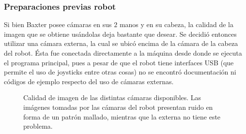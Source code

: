 \subsubsection{Preparaciones previas robot}
Si bien Baxter posee cámaras en sus $2$ manos y en su cabeza, la calidad de la imagen que se obtiene usándolas deja bastante que desear. Se decidió entonces utilizar una cámara externa, la cual se ubicó encima de la cámara de la cabeza del robot. Ésta fue conectada directamente a la máquina desde donde se ejecuta el programa principal, pues a pesar de que el robot tiene interfaces USB (que permite el uso de joysticks entre otras cosas) no se encontró documentación ni códigos de ejemplo respecto del uso de cámaras externas.
\begin{figure}[h!]
	\centering
	\hfill
	\hfill
	\hfill
	\caption[Calidad de imagen de las distintas cámaras disponibles.]{Calidad de imagen de las distintas cámaras disponibles. Las imágenes tomadas por las cámaras del robot presentan ruido en forma de un patrón mallado, mientras que la externa no tiene este problema.}
	\label{camaras}
\end{figure}

